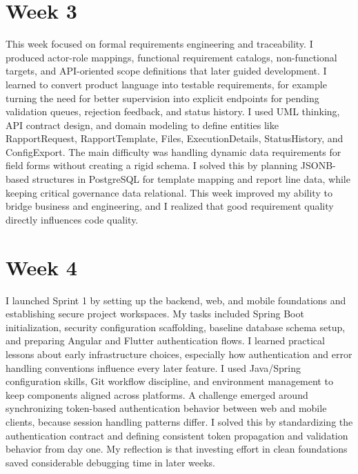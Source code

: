 \section*{Week 3}
This week focused on formal requirements engineering and traceability. I produced actor-role mappings, functional requirement catalogs, non-functional targets, and API-oriented scope definitions that later guided development. I learned to convert product language into testable requirements, for example turning the need for better supervision into explicit endpoints for pending validation queues, rejection feedback, and status history. I used UML thinking, API contract design, and domain modeling to define entities like RapportRequest, RapportTemplate, Files, ExecutionDetails, StatusHistory, and ConfigExport. The main difficulty was handling dynamic data requirements for field forms without creating a rigid schema. I solved this by planning JSONB-based structures in PostgreSQL for template mapping and report line data, while keeping critical governance data relational. This week improved my ability to bridge business and engineering, and I realized that good requirement quality directly influences code quality.

\section*{Week 4}
I launched Sprint 1 by setting up the backend, web, and mobile foundations and establishing secure project workspaces. My tasks included Spring Boot initialization, security configuration scaffolding, baseline database schema setup, and preparing Angular and Flutter authentication flows. I learned practical lessons about early infrastructure choices, especially how authentication and error handling conventions influence every later feature. I used Java/Spring configuration skills, Git workflow discipline, and environment management to keep components aligned across platforms. A challenge emerged around synchronizing token-based authentication behavior between web and mobile clients, because session handling patterns differ. I solved this by standardizing the authentication contract and defining consistent token propagation and validation behavior from day one. My reflection is that investing effort in clean foundations saved considerable debugging time in later weeks.


